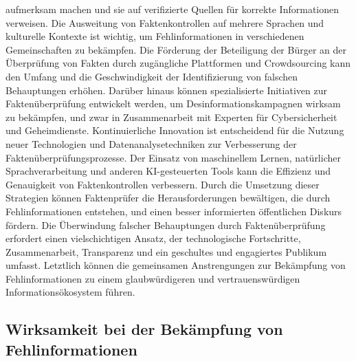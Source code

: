 \documentclass[a4paper,listof=totoc,bibliography=totoc]{scrartcl}
\begin{document}
aufmerksam machen und sie auf verifizierte Quellen für korrekte Informationen verweisen. Die Ausweitung von Faktenkontrollen auf mehrere Sprachen und kulturelle Kontexte 
ist wichtig, um Fehlinformationen in verschiedenen Gemeinschaften zu bekämpfen. Die Förderung der Beteiligung der Bürger an der Überprüfung von Fakten durch zugängliche 
Plattformen und Crowdsourcing kann den Umfang und die Geschwindigkeit der Identifizierung von falschen Behauptungen erhöhen. Darüber hinaus können spezialisierte Initiativen 
zur Faktenüberprüfung entwickelt werden, um Desinformationskampagnen wirksam zu bekämpfen, und zwar in Zusammenarbeit mit Experten für Cybersicherheit und Geheimdienste.
\newline
\newline
Kontinuierliche Innovation ist entscheidend für die Nutzung neuer Technologien und Datenanalysetechniken zur Verbesserung der Faktenüberprüfungsprozesse. Der Einsatz von 
maschinellem Lernen, natürlicher Sprachverarbeitung und anderen KI-gesteuerten Tools kann die Effizienz und Genauigkeit von Faktenkontrollen verbessern. Durch die Umsetzung 
dieser Strategien können Faktenprüfer die Herausforderungen bewältigen, die durch Fehlinformationen entstehen, und einen besser informierten öffentlichen Diskurs fördern. Die 
Überwindung falscher Behauptungen durch Faktenüberprüfung erfordert einen vielschichtigen Ansatz, der technologische Fortschritte, Zusammenarbeit, Transparenz und ein geschultes 
und engagiertes Publikum umfasst. Letztlich können die gemeinsamen Anstrengungen zur Bekämpfung von Fehlinformationen zu einem glaubwürdigeren und vertrauenswürdigen Informationsökosystem 
führen.

\subsection{Wirksamkeit bei der Bekämpfung von Fehlinformationen}
\end{document}
